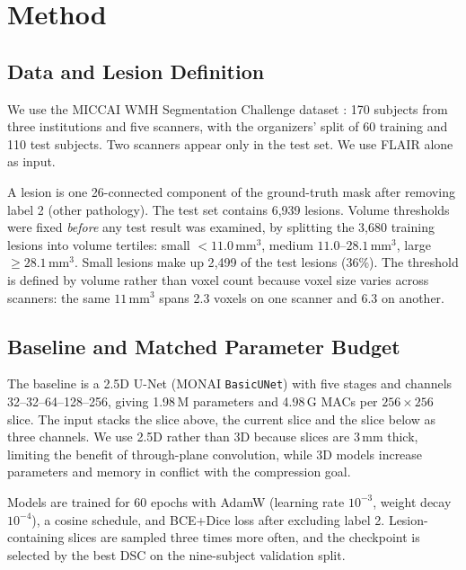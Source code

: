 \documentclass[conference]{IEEEtran}
\begin{document}
\section{Method}

\subsection{Data and Lesion Definition}

We use the MICCAI WMH Segmentation Challenge dataset \cite{kuijf2019wmh}:
170 subjects from three institutions and five scanners, with the
organizers' split of 60 training and 110 test subjects. Two scanners
appear only in the test set. We use FLAIR alone as input.

A lesion is one 26-connected component of the ground-truth mask after
removing label 2 (other pathology). The test set contains 6{,}939
lesions. Volume thresholds were fixed \emph{before} any test result was
examined, by splitting the 3{,}680 training lesions into volume tertiles:
small $<11.0\,\mathrm{mm^3}$, medium $11.0$--$28.1\,\mathrm{mm^3}$, large
$\geq 28.1\,\mathrm{mm^3}$. Small lesions make up 2{,}499 of the test
lesions (36\%). The threshold is defined by volume rather than voxel
count because voxel size varies across scanners: the same
$11\,\mathrm{mm^3}$ spans 2.3 voxels on one scanner and 6.3 on another.

\subsection{Baseline and Matched Parameter Budget}

The baseline is a 2.5D U-Net \cite{ronneberger2015unet} (MONAI \texttt{BasicUNet}) with five stages
and channels 32--32--64--128--256, giving 1.98\,M parameters and 4.98\,G
MACs per $256\!\times\!256$ slice. The input stacks the slice above, the
current slice and the slice below as three channels.
We use 2.5D rather than 3D because slices are 3\,mm thick, limiting the
benefit of through-plane convolution, while 3D models increase parameters
and memory in conflict with the compression goal.

Models are trained for 60 epochs with AdamW (learning rate $10^{-3}$,
weight decay $10^{-4}$), a cosine schedule, and BCE+Dice loss after
excluding label 2. Lesion-containing slices are sampled three times more
often, and the checkpoint is selected by the best DSC on the nine-subject
validation split.
\end{document}
